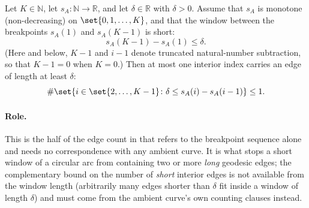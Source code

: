 \begin{helper}
  Let $K \in \mathbb{N}$, let $s_A \colon \mathbb{N} \to \mathbb{R}$, and let
  $\delta \in \mathbb{R}$ with $\delta > 0$. Assume that $s_A$ is monotone (non-decreasing) on
  $\set{0,1,\dots,K}$, and that the window between the breakpoints $s_A(1)$ and $s_A(K-1)$ is
  short:
  \[
    s_A(K-1) - s_A(1) \le \delta
    .
  \]
  (Here and below, $K-1$ and $i-1$ denote truncated natural-number subtraction, so that $K-1 = 0$
  when $K = 0$.) Then at most one interior index carries an edge of length at least $\delta$:
  \[
    \#\set{ i \in \set{2,\dots,K-1} \colon \delta \le s_A(i) - s_A(i-1) } \le 1
    .
  \]

  \paragraph{Role.} This is the half of the edge count in  that
  refers to the breakpoint sequence alone and needs no correspondence with any ambient curve. It
  is what stops a short window of a circular arc from containing two or more \emph{long} geodesic
  edges; the complementary bound on the number of \emph{short} interior edges is not available
  from the window length (arbitrarily many edges shorter than $\delta$ fit inside a window of
  length $\delta$) and must come from the ambient curve's own counting clauses instead.
\end{helper}
